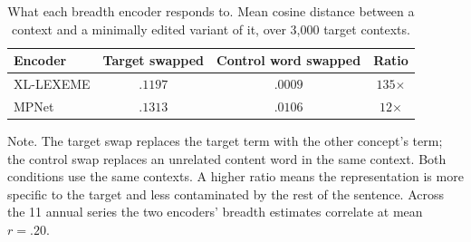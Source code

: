 \begin{table}[t!]
\caption{What each breadth encoder responds to. Mean cosine distance between a context and
a minimally edited variant of it, over 3,000 target contexts.}
\label{tab:probe}
\small
\begin{tabular}{@{}lccc@{}}
\toprule
Encoder & Target swapped & Control word swapped & Ratio \\
\midrule
XL-LEXEME & $.1197$ & $.0009$ & $135$$\times$ \\
MPNet & $.1313$ & $.0106$ & $12$$\times$ \\
\bottomrule
\end{tabular}
\par\vspace{3pt}
\parbox{\linewidth}{\footnotesize Note. The target swap replaces the target term with the
other concept's term; the control swap replaces an unrelated content word in the same
context. Both conditions use the same contexts. A higher ratio means the representation is
more specific to the target and less contaminated by the rest of the sentence. Across the
11 annual series the two encoders' breadth estimates correlate at
mean $r = .20$.}
\end{table}
